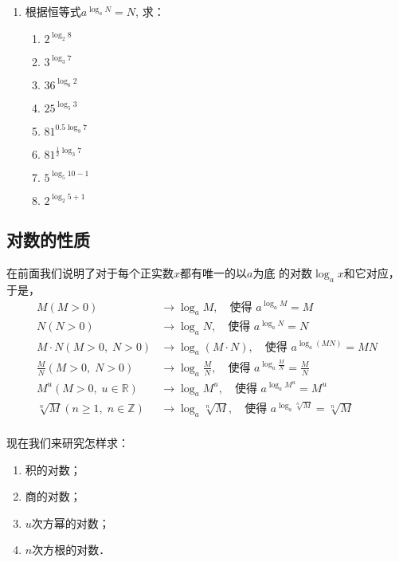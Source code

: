 \begin{ex}
\begin{enumerate}
\item 根据恒等式$a^{\log_a N}=N$, 求：
\begin{multicols}{3}
    \begin{enumerate}
        \item $2^{\log_2 8}$
        \item $3^{\log_3 7}$
        \item $36^{\log_6 2}$
        \item $25^{\log_5 3}$
        \item $81^{0.5\log_9 7}$
        \item $81^{\tfrac{1}{2}\log_3 7}$
        \item $5^{\log_5 10-1}$
        \item $2^{\log_2 5+1}$
    \end{enumerate}
    \end{multicols} 
\end{enumerate} 
\end{ex}

\subsection{对数的性质}
在前面我们说明了对于每个正实数$x$都有唯一的以$a$为底
的对数$\log_a x$和它对应，于是，
\[\begin{split}
   M(M>0)&\longrightarrow \log_a M,\quad \text{使得 } a^{\log_a M}=M \\
   N(N>0)&\longrightarrow \log_a N,\quad \text{使得 } a^{\log_a N}=N \\
   M\cdot N(M>0,\; N>0)&\longrightarrow \log_a (M\cdot N),\quad \text{使得 } a^{\log_a (MN)}=MN \\
   \frac{M}{N}(M>0,\; N>0)&\longrightarrow \log_a \frac{M}{N},\quad \text{使得 } a^{\log_a \tfrac{M}{N}}=\frac{M}{N} \\
   M^u(M>0,\; u\in\mathbb{R})&\longrightarrow \log_a M^u,\quad \text{使得 } a^{\log_a M^u}=M^u \\
   \sqrt[n]{M}(n\ge 1,\; n\in\mathbb{Z})&\longrightarrow \log_a \sqrt[n]{M},\quad \text{使得 } a^{\log_a \sqrt[n]{M}}=\sqrt[n]{M} \\
\end{split}\]

现在我们来研究怎样求：
\begin{enumerate}
    \item 积的对数；
    \item 商的对数；
    \item $u$次方幂的对数；
    \item $n$次方根的对数．
\end{enumerate}

